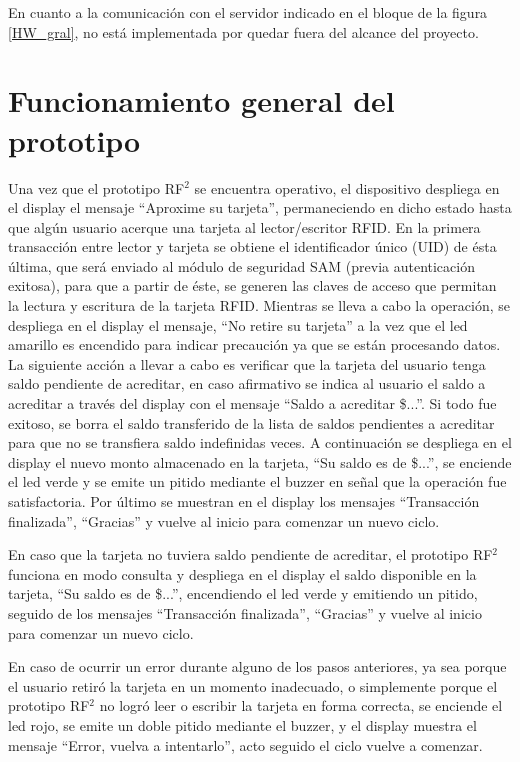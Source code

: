 En cuanto a la comunicación con el servidor indicado en el bloque de la figura \ref{HW_gral}, no está implementada por quedar fuera del alcance del proyecto.

\section{Funcionamiento general del prototipo}
Una vez que el prototipo RF$^{2}$ se encuentra operativo, el dispositivo despliega en el display el mensaje “Aproxime su tarjeta”, permaneciendo en dicho estado hasta que algún usuario acerque una tarjeta al lector/escritor RFID. 
En la primera transacción entre lector y tarjeta se obtiene el identificador único (UID) de ésta última, que será enviado al módulo de seguridad SAM (previa autenticación exitosa), para que a partir de éste, se generen las claves de acceso que permitan la lectura y escritura de la tarjeta RFID.
Mientras se lleva a cabo la operación, se despliega en el display el mensaje, “No retire su tarjeta” a la vez que el led amarillo es encendido para indicar precaución ya que se están procesando datos.
La siguiente acción a llevar a cabo es verificar que la tarjeta del usuario tenga saldo pendiente de acreditar, en caso afirmativo se indica al usuario el saldo a acreditar a través del display con el mensaje “Saldo a acreditar \$...”. Si todo fue exitoso, se borra el saldo transferido de la lista de saldos pendientes a acreditar para que no se transfiera saldo indefinidas veces.
A continuación se despliega en el display el nuevo monto almacenado en la tarjeta, “Su saldo es de \$...”, se enciende el led verde y se emite un pitido mediante el buzzer en señal que la operación fue satisfactoria.
Por último se muestran en el display los mensajes “Transacción finalizada”, “Gracias” y vuelve al inicio para comenzar un nuevo ciclo.

En caso que la tarjeta no tuviera saldo pendiente de acreditar, el prototipo RF$^{2}$ funciona en modo consulta y despliega en el display el saldo disponible en la tarjeta, “Su saldo es de \$...”, encendiendo el led verde y emitiendo un pitido, seguido de los mensajes “Transacción finalizada”, “Gracias” y vuelve al inicio para comenzar un nuevo ciclo.

En caso de ocurrir un error durante alguno de los pasos anteriores, ya sea porque
el usuario retiró la tarjeta en un momento inadecuado, o simplemente porque el prototipo RF$^{2}$
no logró leer o escribir la tarjeta en forma correcta, se enciende el led rojo, se emite un
doble pitido mediante el buzzer, y el display muestra el mensaje “Error, vuelva a intentarlo”,
acto seguido el ciclo vuelve a comenzar. 

